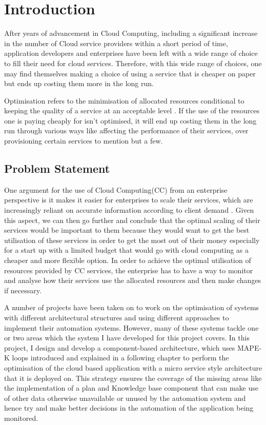 \chapter{Introduction}\label{ch:introduction}
After years of advancement in Cloud Computing, including a significant increase in the number of Cloud service providers within a short period of time, application developers and enterprises have been left with a wide range of choice to fill their need for cloud services. Therefore, with this wide range of choices, one may find themselves making a choice of using a service that is cheaper on paper but ends up costing them more in the long run.

Optimisation refers to the minimisation of allocated resources conditional to keeping the quality of a service at an acceptable level \cite{quarati2012delivering}. If the use of the resources one is paying cheaply for isn't optimised, it will end up costing them in the long run through various ways like affecting the performance of their services, over provisioning certain services to mention but a few.

\section{Problem Statement}
One argument for the use of Cloud Computing(CC) from an enterprise perspective is it makes it easier for enterprises to scale their services, which are increasingly reliant on accurate information according to client demand \cite{avram2014advantages}. Given this aspect, we can then go further and conclude that the optimal scaling of their services would be important to them because they would want to get the best utilisation of these services in order to get the most out of their money especially for a start up with a limited budget that would go with cloud computing as a cheaper and more flexible option. In order to achieve the optimal utilisation of resources provided by CC services, the enterprise has to have a way to monitor and analyse how their services use the allocated resources and then make changes if necessary.

A number of projects have been taken on to work on the optimisation of systems with different architectural structures and using different approaches to implement their automation systems. However, many of these systems tackle one or two areas which the system I have developed for this project covers.
In this project, I design and develop a component-based architecture, which uses MAPE-K loops introduced and explained in a following chapter to perform the optimisation of the cloud based application with a micro service style architecture that it is deployed on. This strategy ensures the coverage of the missing areas like the implementation of a plan and Knowledge base component that can make use of other data otherwise unavailable or unused by the automation system and hence try and make better decisions in the automation of the application being monitored.

